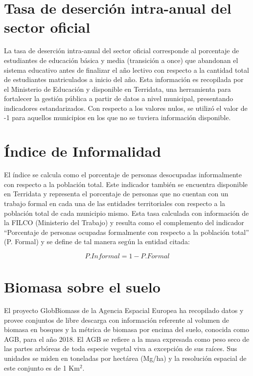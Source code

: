 \section{Tasa de deserción intra-anual del sector oficial}

La tasa de deserción intra-anual del sector oficial corresponde al porcentaje de estudiantes de educación básica y media (transición a once) que abandonan el 
sistema educativo antes de finalizar el año lectivo con respecto a la cantidad total de estudiantes matriculados a inicio del año. Esta información es 
recopilada por el Ministerio de Educación y disponible en Terridata, una herramienta para fortalecer la gestión pública a partir de datos a nivel municipal, 
presentando indicadores estandarizados. Con respecto a los valores nulos, se utilizó el valor de -1 para aquellos municipios en los que no se tuviera 
información disponible.

\section{Índice de Informalidad}

El índice se calcula como el porcentaje de personas desocupadas informalmente con respecto a la población total.  Este indicador también se encuentra 
disponible en Terridata y representa el porcentaje de personas que no cuentan con un trabajo formal en cada una de las entidades territoriales con respecto a 
la población total de cada municipio mismo. Esta tasa calculada con información de la FILCO (Ministerio del Trabajo) y resulta como el complemento del 
indicador ``Porcentaje de personas ocupadas formalmente con respecto a la población total'' (P. Formal) y se define de tal manera según la entidad citada: 

$$P. Informal = 1 - P. Formal$$

\section{Biomasa sobre el suelo}

El proyecto GlobBiomass \cite{santoro_globbiomass_2018, santoro_detailed_2018} de la Agencia Espacial Europea ha recopilado datos y provee conjuntos de libre 
descarga con información referente al volumen de biomasa en bosques y la métrica de biomasa por encima del suelo, conocida como AGB, para el año 2018.  El AGB 
se refiere a la masa expresada como peso seco de las partes arbóreas de toda especie vegetal viva a excepción de sus raíces.  Sus unidades se miden en toneladas 
por hectárea (Mg/ha) y la resolución espacial de este conjunto es de 1 Km$^2$.

